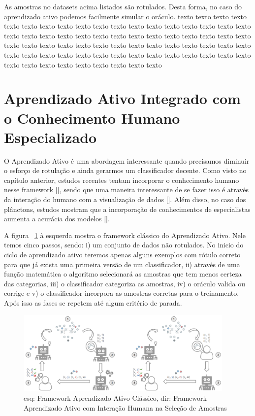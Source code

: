As amostras no datasets acima listados são rotulados. Desta forma, no caso do aprendizado ativo podemos facilmente simular o oráculo. texto texto texto texto texto texto texto texto texto texto texto texto texto texto texto texto texto texto texto texto texto texto texto texto texto texto texto texto texto texto texto texto texto texto texto texto texto texto texto texto texto texto texto texto texto texto texto texto texto texto texto texto texto texto texto texto texto texto texto texto texto texto texto texto texto texto texto texto texto          



\section{Aprendizado Ativo Integrado com o Conhecimento Humano Especializado}
\label{sec:aprendizado_ativo_conhecimento_humano}

O Aprendizado Ativo é uma abordagem interessante quando precisamos diminuir o esforço de rotulação e ainda gerarmos um classificador decente. Como visto no capítulo anterior, estudos recentes tentam incorporar o conhecimento humano nesse framework [\cite{castro2009human, kottke2018other}], sendo que uma maneira interessante de se fazer isso é através da interação do humano com a visualização de dados [\cite{yang2018visually, bernard2018comparing, weigl2016mapview}]. Além disso, no caso dos plânctons, estudos mostram que a incorporação de conhecimentos de especialistas aumenta a acurácia dos modelos [\cite{benfield2007rapid}].

A figura ~\ref{fig:frameworks_AL} à esquerda mostra o framework clássico do Aprendizado Ativo. Nele temos cinco passos, sendo: i) um conjunto de dados não rotulados. No inicio do ciclo de aprendizado ativo teremos apenas alguns exemplos com rótulo correto para que já exista uma primeira versão de um classificador, ii) através de uma função matemática o algoritmo selecionará as amostras que tem menos certeza das categorias, iii) o classificador categoriza as amostras, iv) o oráculo valida ou corrige e v) o classificador incorpora as amostras corretas para o treinamento. Após isso as fases se repetem até algum critério de parada.

\begin{figure}
  \centering
  \includegraphics[width=0.95\textwidth]{figures/Frameworks_Active_Learning.png}
  \caption{esq: Framework Aprendizado Ativo Clássico, dir: Framework Aprendizado Ativo com Interação Humana na Seleção de Amostras}
  \label{fig:frameworks_AL}
\end{figure}

